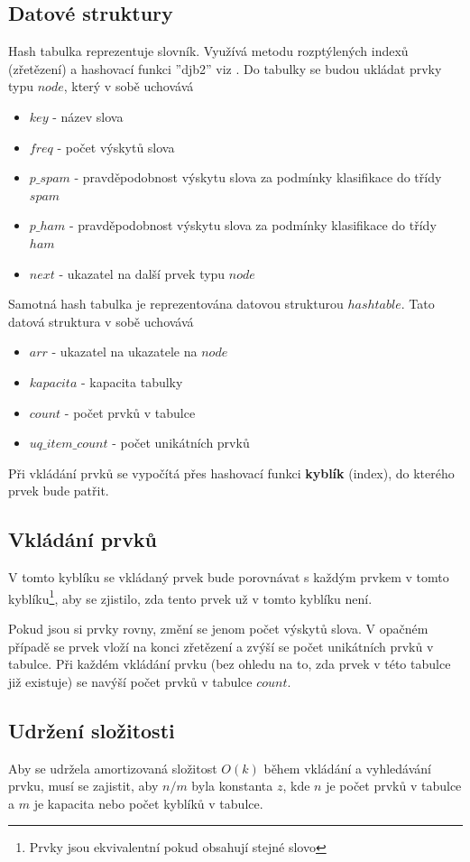 \documentclass[12pt]{report}
\begin{document}
\subsection{Datové struktury}
Hash tabulka reprezentuje slovník. Využívá metodu rozptýlených indexů (zřetězení) a hashovací funkci ''djb2'' viz \cite{djb2}. Do tabulky se budou ukládat prvky typu $node$, který v sobě uchovává
\begin{itemize}
    \item $key$ - název slova 
    \item $freq$ - počet výskytů slova
    \item $p\_spam$ - pravděpodobnost výskytu slova za podmínky klasifikace do třídy $spam$
    \item $p\_ham$ - pravděpodobnost výskytu slova za podmínky klasifikace do třídy $ham$
    \item $next$ - ukazatel na další prvek typu $node$
\end{itemize}
Samotná hash tabulka je reprezentována datovou strukturou $hashtable$. Tato datová struktura v sobě uchovává
\begin{itemize}
    \item $arr$ - ukazatel na ukazatele na $node$
    \item $kapacita$ - kapacita tabulky
    \item $count$ - počet prvků v tabulce
    \item $uq\_item\_count$ - počet unikátních prvků
\end{itemize}
Při vkládání prvků se vypočítá přes hashovací funkci \textbf{kyblík} (index), do kterého prvek bude patřit. 
\subsection{Vkládání prvků}
V tomto kyblíku se vkládaný prvek bude porovnávat s každým prvkem v tomto kyblíku\footnote{Prvky jsou ekvivalentní pokud obsahují stejné slovo}, aby se zjistilo, zda
tento prvek už v tomto kyblíku není. 

Pokud jsou si prvky rovny, změní se jenom počet výskytů slova. V opačném případě se prvek vloží na konci zřetězení a zvýší se počet unikátních prvků v tabulce. Při každém vkládání prvku (bez ohledu na to, zda prvek v této tabulce již existuje) se navýší počet prvků v tabulce $count$.
\subsection{Udržení složitosti}
Aby se udržela amortizovaná složitost $O(k)$ během vkládání a vyhledávání prvku, musí se zajistit, aby $n/m$ byla konstanta $z$, kde $n$ je počet prvků v tabulce a $m$ je kapacita nebo počet kyblíků v tabulce. 
\end{document}
